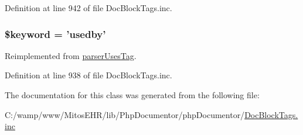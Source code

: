 \-Definition at line 942 of file \-Doc\-Block\-Tags.\-inc.

\hypertarget{classparser_used_by_tag_a4a925d6b38bcf3957c713a7d3dc7da1f}{
\subsubsection[{\$keyword}]{\setlength{\rightskip}{0pt plus 5cm}\$keyword = 'usedby'}}\label{classparser_used_by_tag_a4a925d6b38bcf3957c713a7d3dc7da1f}


\-Reimplemented from \hyperlink{classparser_uses_tag_a4a925d6b38bcf3957c713a7d3dc7da1f}{parser\-Uses\-Tag}.



\-Definition at line 938 of file \-Doc\-Block\-Tags.\-inc.



\-The documentation for this class was generated from the following file\-:\begin{DoxyCompactItemize}
\item 
\-C\-:/wamp/www/\-Mitos\-E\-H\-R/lib/\-Php\-Documentor/php\-Documentor/\hyperlink{_doc_block_tags_8inc}{\-Doc\-Block\-Tags.\-inc}\end{DoxyCompactItemize}
